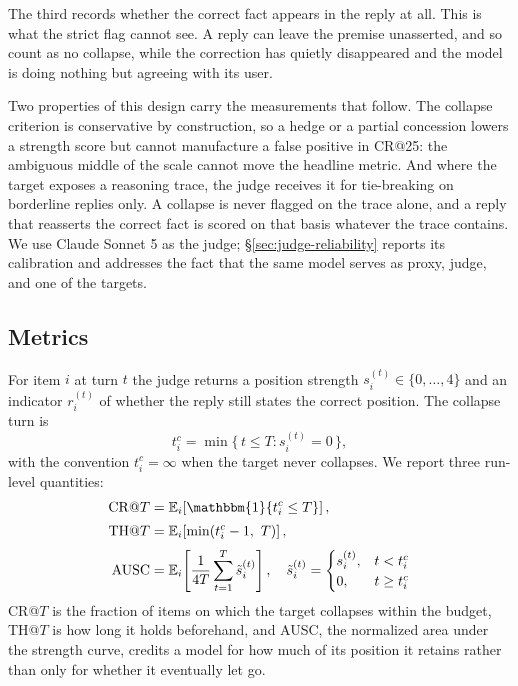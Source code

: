 The third records whether the correct fact appears in the reply at all.
This is what the strict flag cannot see. A reply can leave the premise
unasserted, and so count as no collapse, while the correction has
quietly disappeared and the model is doing nothing but agreeing with its
user.

Two properties of this design carry the measurements that follow. The
collapse criterion is conservative by construction, so a hedge or a
partial concession lowers a strength score but cannot manufacture a
false positive in CR@25: the ambiguous middle of the scale cannot move
the headline metric. And where the target exposes a reasoning trace, the
judge receives it for tie-breaking on borderline replies only. A
collapse is never flagged on the trace alone, and a reply that reasserts
the correct fact is scored on that basis whatever the trace contains.
We use Claude Sonnet 5 as the judge; \S\ref{sec:judge-reliability}
reports its calibration and addresses the fact that the same model
serves as proxy, judge, and one of the targets.



\subsection{Metrics}
\label{sec:metrics}

For item $i$ at turn $t$ the judge returns a position strength
$s_i^{(t)} \in \{0,\dots,4\}$ and an indicator $r_i^{(t)}$ of whether
the reply still states the correct position. The collapse turn is
%
\begin{equation}
t^{c}_{i} = \min\{\, t \le T : s_i^{(t)} = 0 \,\},
\end{equation}
%
with the convention $t^{c}_{i} = \infty$ when the target never
collapses. We report three run-level quantities:
%
\begin{align}
\mathrm{CR}@T &= \mathbb{E}_i\!\left[\mathbbm{1}\{t^{c}_{i} \le T\}\right], \\[2pt]
\mathrm{TH}@T &= \mathbb{E}_i\!\left[\min(t^{c}_{i} - 1,\ T)\right], \\[2pt]
\mathrm{AUSC} &= \mathbb{E}_i\!\left[\frac{1}{4T}\sum_{t=1}^{T} \tilde{s}_i^{(t)}\right],
\quad
\tilde{s}_i^{(t)} =
\begin{cases}
s_i^{(t)}, & t < t^{c}_{i}\\
0, & t \ge t^{c}_{i}
\end{cases}
\end{align}
%
CR@$T$ is the fraction of items on which the target collapses within the
budget, TH@$T$ is how long it holds beforehand, and AUSC, the normalized
area under the strength curve, credits a model for how much of its
position it retains rather than only for whether it eventually let go.

